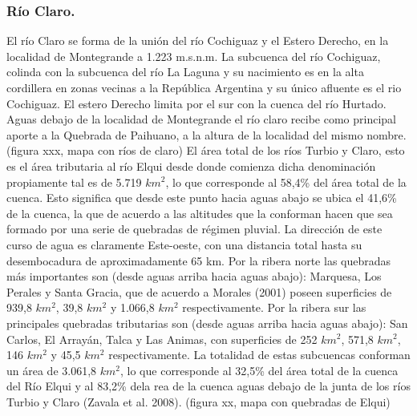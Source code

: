 \documentclass[10pt]{article}
\begin{document}
\subsubsection{Río Claro.}
El río Claro se forma de la unión del río Cochiguaz y el Estero Derecho, en la localidad de Montegrande a 1.223 m.s.n.m. La subcuenca del río Cochiguaz, colinda con la subcuenca del río La Laguna y su nacimiento es en la alta cordillera en zonas vecinas a la República Argentina y su único afluente es el rio Cochiguaz. El estero Derecho limita por el sur con la cuenca del río Hurtado. Aguas debajo de la localidad de Montegrande el río claro recibe como principal aporte a la Quebrada de Paihuano, a la altura de la localidad del mismo nombre. (figura xxx, mapa con ríos de claro)
El área total de los ríos Turbio y Claro, esto es el área tributaria  al río Elqui desde donde comienza dicha denominación propiamente tal es de 5.719 $km^2$, lo que corresponde al 58,4\% del  área total de la cuenca. Esto significa que desde este punto hacia aguas abajo se ubica el 41,6\% de la cuenca, la que de acuerdo a las altitudes que la conforman hacen que sea formado por una serie de quebradas de régimen pluvial. La dirección de este curso de agua es claramente Este-oeste, con una distancia total hasta su desembocadura de aproximadamente 65 km. Por la ribera norte las quebradas más importantes son (desde aguas arriba hacia aguas abajo): Marquesa, Los Perales y Santa Gracia, que de acuerdo a Morales (2001) poseen superficies de 939,8 $km^2$, 39,8 $km^2$ y 1.066,8 $km^2$ respectivamente. Por la ribera sur las principales quebradas tributarias son (desde aguas arriba hacia aguas abajo): San Carlos, El Arrayán, Talca y Las Animas, con superficies de 252 $km^2$, 571,8 $km^2$, 146 $km^2$ y 45,5 $km^2$ respectivamente. La totalidad de estas subcuencas conforman un área de 3.061,8 $km^2$, lo que corresponde al 32,5\% del área total de la cuenca del Río Elqui y al 83,2\% dela rea de la cuenca aguas debajo de la junta de los ríos Turbio y Claro (Zavala et al. 2008). (figura xx, mapa con quebradas de Elqui)
\end{document}
